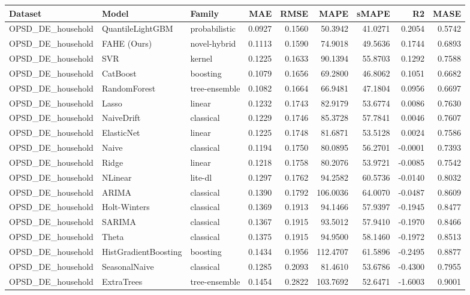 \begin{tabular}{lllrrrrrr}
\toprule
Dataset & Model & Family & MAE & RMSE & MAPE & sMAPE & R2 & MASE \\
\midrule
OPSD_DE_household & QuantileLightGBM & probabilistic & 0.0927 & 0.1560 & 50.3942 & 41.0271 & 0.2054 & 0.5742 \\
OPSD_DE_household & FAHE (Ours) & novel-hybrid & 0.1113 & 0.1590 & 74.9018 & 49.5636 & 0.1744 & 0.6893 \\
OPSD_DE_household & SVR & kernel & 0.1225 & 0.1633 & 90.1394 & 55.8703 & 0.1292 & 0.7588 \\
OPSD_DE_household & CatBoost & boosting & 0.1079 & 0.1656 & 69.2800 & 46.8062 & 0.1051 & 0.6682 \\
OPSD_DE_household & RandomForest & tree-ensemble & 0.1082 & 0.1664 & 66.9481 & 47.1804 & 0.0956 & 0.6697 \\
OPSD_DE_household & Lasso & linear & 0.1232 & 0.1743 & 82.9179 & 53.6774 & 0.0086 & 0.7630 \\
OPSD_DE_household & NaiveDrift & classical & 0.1229 & 0.1746 & 85.3728 & 57.7841 & 0.0046 & 0.7607 \\
OPSD_DE_household & ElasticNet & linear & 0.1225 & 0.1748 & 81.6871 & 53.5128 & 0.0024 & 0.7586 \\
OPSD_DE_household & Naive & classical & 0.1194 & 0.1750 & 80.0895 & 56.2701 & -0.0001 & 0.7393 \\
OPSD_DE_household & Ridge & linear & 0.1218 & 0.1758 & 80.2076 & 53.9721 & -0.0085 & 0.7542 \\
OPSD_DE_household & NLinear & lite-dl & 0.1297 & 0.1762 & 94.2582 & 60.5736 & -0.0140 & 0.8032 \\
OPSD_DE_household & ARIMA & classical & 0.1390 & 0.1792 & 106.0036 & 64.0070 & -0.0487 & 0.8609 \\
OPSD_DE_household & Holt-Winters & classical & 0.1369 & 0.1913 & 94.1466 & 57.9397 & -0.1945 & 0.8477 \\
OPSD_DE_household & SARIMA & classical & 0.1367 & 0.1915 & 93.5012 & 57.9410 & -0.1970 & 0.8466 \\
OPSD_DE_household & Theta & classical & 0.1375 & 0.1915 & 94.9500 & 58.1460 & -0.1972 & 0.8513 \\
OPSD_DE_household & HistGradientBoosting & boosting & 0.1434 & 0.1956 & 112.4707 & 61.5896 & -0.2495 & 0.8877 \\
OPSD_DE_household & SeasonalNaive & classical & 0.1285 & 0.2093 & 81.4610 & 53.6786 & -0.4300 & 0.7955 \\
OPSD_DE_household & ExtraTrees & tree-ensemble & 0.1454 & 0.2822 & 103.7692 & 52.6471 & -1.6003 & 0.9001 \\

\end{tabular}
